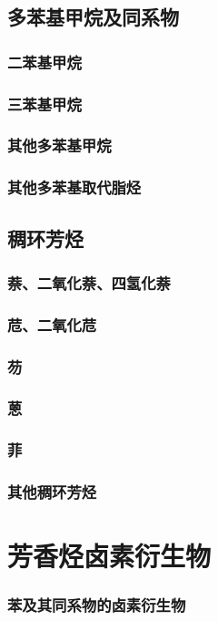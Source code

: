 \documentclass[UTF8]{../03-Chemistry}
\begin{document}
    \subsection{多苯基甲烷及同系物}
        \subsubsection{二苯基甲烷}
        \subsubsection{三苯基甲烷}
        \subsubsection{其他多苯基甲烷}
        \subsubsection{其他多苯基取代脂烃}
    \subsection{稠环芳烃}
        \subsubsection{萘、二氧化萘、四氢化萘}
        \subsubsection{苊、二氧化苊}
        \subsubsection{芴}
        \subsubsection{蒽}
        \subsubsection{菲}
        \subsubsection{其他稠环芳烃}
\section{芳香烃卤素衍生物}
    \subsubsection{苯及其同系物的卤素衍生物}
\end{document}
